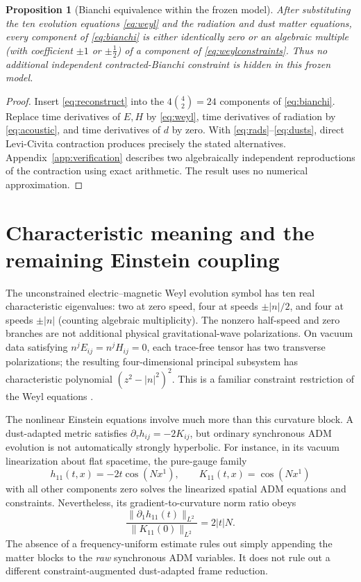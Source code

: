 \documentclass[10pt,a4paper]{article}
\newtheorem{proposition}[theorem]{Proposition}
\begin{document}
\begin{proposition}[Bianchi equivalence within the frozen model]\label{prop:bianchi}
After substituting the ten evolution equations \eqref{eq:weyl} and the radiation and dust matter equations, every component of \eqref{eq:bianchi} is either identically zero or an algebraic multiple (with coefficient $\pm1$ or $\pm\frac12$) of a component of \eqref{eq:weylconstraints}. Thus no additional independent contracted-Bianchi constraint is hidden in this frozen model.
\end{proposition}
\begin{proof}
Insert \eqref{eq:reconstruct} into the $4\binom42=24$ components of \eqref{eq:bianchi}. Replace time derivatives of $E,H$ by \eqref{eq:weyl}, time derivatives of radiation by \eqref{eq:acoustic}, and time derivatives of $d$ by zero. With \eqref{eq:rads}--\eqref{eq:dusts}, direct Levi-Civita contraction produces precisely the stated alternatives. Appendix~\ref{app:verification} describes two algebraically independent reproductions of the contraction using exact arithmetic. The result uses no numerical approximation.
\end{proof}

\section{Characteristic meaning and the remaining Einstein coupling}
The unconstrained electric--magnetic Weyl evolution symbol has ten real characteristic eigenvalues: two at zero speed, four at speeds $\pm|n|/2$, and four at speeds $\pm|n|$ (counting algebraic multiplicity). The nonzero half-speed and zero branches are not additional physical gravitational-wave polarizations. On vacuum data satisfying $n^jE_{ij}=n^jH_{ij}=0$, each trace-free tensor has two transverse polarizations; the resulting four-dimensional principal subsystem has characteristic polynomial $(z^2-|n|^2)^2$. This is a familiar constraint restriction of the Weyl equations \cite{vanElstEllis}.

The nonlinear Einstein equations involve much more than this curvature block. A dust-adapted metric satisfies $\partial_\tau h_{ij}=-2K_{ij}$, but ordinary synchronous ADM evolution is not automatically strongly hyperbolic. For instance, in its vacuum linearization about flat spacetime, the pure-gauge family
\begin{equation}\label{eq:gauge}
h_{11}(t,x)=-2t\cos(Nx^1),\qquad K_{11}(t,x)=\cos(Nx^1)
\end{equation}
with all other components zero solves the linearized spatial ADM equations and constraints. Nevertheless, its gradient-to-curvature norm ratio obeys
\[
\frac{\|\partial_1h_{11}(t)\|_{L^2}}{\|K_{11}(0)\|_{L^2}}=2|t|N.
\] The absence of a frequency-uniform estimate rules out simply appending the matter blocks to the \emph{raw} synchronous ADM variables. It does not rule out a different constraint-augmented dust-adapted frame reduction.
\end{document}
